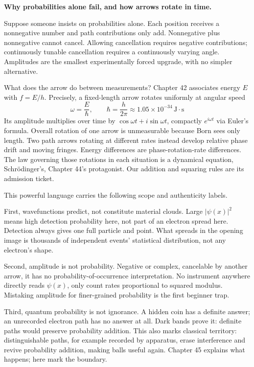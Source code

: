 \begin{challenge}
\textbf{Why probabilities alone fail, and how arrows rotate in time.}

Suppose someone insists on probabilities alone. Each position receives a nonnegative number and path contributions only add. Nonnegative plus nonnegative cannot cancel. Allowing cancellation requires negative contributions; continuously tunable cancellation requires a continuously varying angle. Amplitudes are the smallest experimentally forced upgrade, with no simpler alternative.

What does the arrow do between measurements? Chapter 42 associates energy \(E\) with \(f = E/h\). Precisely, a fixed-length arrow rotates uniformly at angular speed
\[
\omega = \frac{E}{\hbar}, \qquad \hbar = \frac{h}{2\pi} \approx 1.05\times10^{-34}\,\mathrm{J\cdot s}
\]
Its amplitude multiplies over time by \(\cos\omega t + i\sin\omega t\), compactly \(e^{i\omega t}\) via Euler's formula. Overall rotation of one arrow is unmeasurable because Born sees only length. Two path arrows rotating at different rates instead develop relative phase drift and moving fringes. Energy differences are phase-rotation-rate differences. The law governing those rotations in each situation is a dynamical equation, Schrödinger's, Chapter 44's protagonist. Our addition and squaring rules are its admission ticket.
\end{challenge}


This powerful language carries the following scope and authenticity labels.

First, wavefunctions predict, not constitute material clouds. Large \(|\psi(x)|^2\) means high detection probability here, not part of an electron spread here. Detection always gives one full particle and point. What spreads in the opening image is thousands of independent events' statistical distribution, not any electron's shape.

Second, amplitude is not probability. Negative or complex, cancelable by another arrow, it has no probability-of-occurrence interpretation. No instrument anywhere directly reads \(\psi(x)\), only count rates proportional to squared modulus. Mistaking amplitude for finer-grained probability is the first beginner trap.

Third, quantum probability is not ignorance. A hidden coin has a definite answer; an unrecorded electron path has no answer at all. Dark bands prove it: definite paths would preserve probability addition. This also marks classical territory: distinguishable paths, for example recorded by apparatus, erase interference and revive probability addition, making balls useful again. Chapter 45 explains what happens; here mark the boundary.

